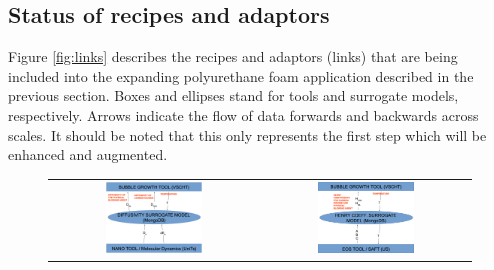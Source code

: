 \subsection{Status of recipes and adaptors}

Figure \ref{fig:links} describes the recipes and adaptors (links) that are being
included into the expanding polyurethane foam application described in the
previous section. Boxes and ellipses stand for tools and surrogate models,
respectively.  Arrows indicate the flow of data forwards and backwards across
scales. It should be noted that this only represents the first step which will
be enhanced and augmented.

\begin{figure}
  \centering
  \begin{tabular}{cc}
    \includegraphics[width=0.48\textwidth,keepaspectratio=true]{./Content/Figures/PU_exercise_2.eps} &
    \includegraphics[width=0.48\textwidth,keepaspectratio=true]{./Content/Figures/PU_exercise_3.eps} \\


\end{tabular}
\end{figure}
